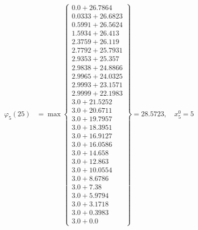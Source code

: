 \documentclass{article}
\begin{document}
\begin{align*}
\varphi_{5}(25) &= \max \left\{ \begin{array}{c}
0.0 + 26.7864 \\
 0.0333 + 26.6823 \\
 0.5991 + 26.5624 \\
 1.5934 + 26.413 \\
 2.3759 + 26.119 \\
 2.7792 + 25.7931 \\
 2.9353 + 25.357 \\
 2.9838 + 24.8866 \\
 2.9965 + 24.0325 \\
 2.9993 + 23.1571 \\
 2.9999 + 22.1983 \\
 3.0 + 21.5252 \\
 3.0 + 20.6711 \\
 3.0 + 19.7957 \\
 3.0 + 18.3951 \\
 3.0 + 16.9127 \\
 3.0 + 16.0586 \\
 3.0 + 14.658 \\
 3.0 + 12.863 \\
 3.0 + 10.0554 \\
 3.0 + 8.6786 \\
 3.0 + 7.38 \\
 3.0 + 5.9794 \\
 3.0 + 3.1718 \\
 3.0 + 0.3983 \\
 3.0 + 0.0
\end{array} \right\}=28.5723, \quad x_{5}^0=5\\
  

\end{align*}
\end{document}
